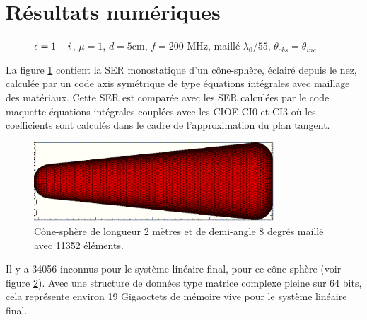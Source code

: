 \section{Résultats numériques}

  \begin{figure}[!hbt]
    \centering
    
    \caption[SER monostatique d'un cône-sphère calculée par un code EI]{\(\epsilon = 1 - i\), \(\mu = 1\), \(d = 5\)cm, \( f =  200\) MHz, maillé \(\lambda_0/55\), \(\theta_{obs}=\theta_{inc}\)}
    \label{fig:ser:cone-sphere-mono-M1}
  \end{figure}

  La figure \ref{fig:ser:cone-sphere-mono-M1} contient la SER monostatique d'un cône-sphère, éclairé depuis le nez, calculée par un code axis symétrique de type équations intégrales avec maillage des matériaux.
  Cette SER est comparée avec les SER calculées par le code maquette équations intégrales couplées avec les CIOE CI0 et CI3 où les coefficients sont calculés dans le cadre de l'approximation du plan tangent.

  \begin{figure}[!hbt]
    \centering
    \includegraphics[width=0.8\textwidth]{images/cone.png}
    \caption{Cône-sphère de longueur 2 mètres et de demi-angle 8 degrés maillé avec 11352 éléments.}
    \label{fig:obj:cone-sphere}
  \end{figure}

  Il y a 34056 inconnus pour le système linéaire final, pour ce cône-sphère (voir figure \ref{fig:obj:cone-sphere}).
  Avec une structure de données type matrice complexe pleine sur 64 bits, cela représente environ 19 Gigaoctets de mémoire vive pour le système linéaire final.


